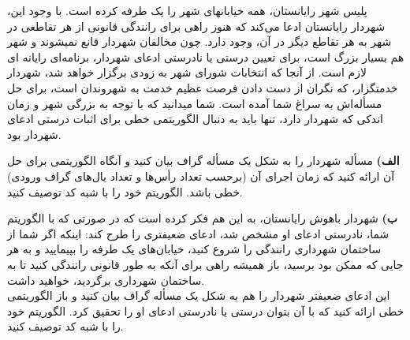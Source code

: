 \documentclass{article}
\begin{document}
پلیس شهر رایانستان، همه خیابانهای شهر را یک طرفه کرده است. با وجود این، 
شهردار رایانستان ادعا می‌کند که هنوز راهی برای رانندگی قانونی از هر تقاطعی در شهر به هر تقاطع دیگر در آن، وجود دارد.
 چون مخالفان شهردار قانع نمیشوند و شهر هم بسیار بزرگ است،
 برای تعیین درستی یا نادرستی ادعای شهردار، برنامه‌ای رایانه ای لازم است. از آنجا که انتخابات شورای شهر به زودی برگزار خواهد شد،
 شهردار خدمتگزار، که نگران از دست دادن فرصت عظیم خدمت به شهروندان است، برای حل مسأله‌اش به سراغ شما آمده است.
 شما میدانید که با توجه به بزرگی شهر و زمان اندکی که شهردار دارد، تنها باید به دنبال الگوریتمی خطی برای اثبات درستی ادعای شهردار بود.

\textbf{الف)}
 مسأله شهردار را به شکل یک مسأله گراف بیان کنید
 و آنگاه الگوریتمی برای حل آن ارائه کنید که زمان اجرای آن (برحسب تعداد رأس‌ها و تعداد یال‌های گراف ورودی) 
 خطی باشد. الگوریتم خود را با شبه کد توصیف کنید.

 \textbf{ب)} 
شهردار باهوش رایانستان، به این هم فکر کرده است که در صورتی که با الگوریتم شما،
 نادرستی ادعای او مشخص شد، ادعای ضعیفتری را طرح کند:
 اینکه اگر شما از ساختمان شهرداری رانندگی را شروع کنید، خیابان‌های یک طرفه را بپیمایید و به هر جایی که ممکن بود برسید، 
 باز همیشه راهی برای آنکه به طور قانونی رانندگی کنید تا به ساختمان شهرداری برگردید، خواهید داشت. \\
 این ادعای ضعیفتر شهردار را هم به شکل یک مسأله گراف بیان کنید و باز الگوریتمی خطی ارائه کنید
 که با آن بتوان درستی یا نادرستی ادعای او را تحقیق کرد.
 الگوریتم خود را با شبه کد توصیف کنید.
 
\end{document}
